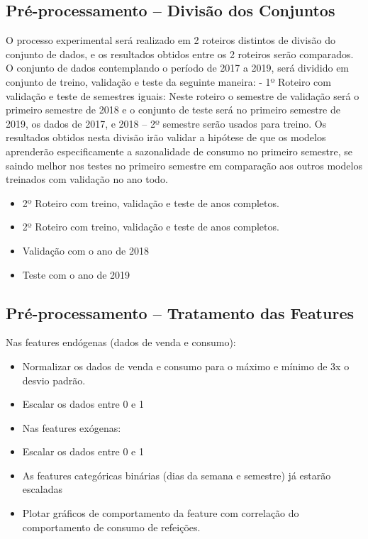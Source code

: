 \documentclass[	12pt, Times, openright, twoside, a4paper, english, brazil]{abntex2}
\begin{document}
	\subsection{Pré-processamento – Divisão dos Conjuntos}
        O processo experimental será realizado em 2 roteiros distintos de divisão do conjunto de dados, e os resultados obtidos entre os 2 roteiros serão comparados.
        O conjunto de dados contemplando o período de 2017 a 2019, será dividido em conjunto de treino, validação e teste da seguinte maneira: 
        - 1º Roteiro com validação e teste de semestres iguais: 
        Neste roteiro o semestre de validação será o primeiro semestre de 2018 e o conjunto de teste será no primeiro semestre de 2019, os dados de 2017, e 2018 – 2º semestre serão usados para treino. Os resultados obtidos nesta divisão irão validar a hipótese de que os modelos aprenderão especificamente a sazonalidade de consumo no primeiro semestre, se saindo melhor nos testes no primeiro semestre em comparação aos outros modelos treinados com validação no ano todo.
        \begin{itemize}
                \item 2º Roteiro com treino, validação e teste de anos completos.
                \item 2º Roteiro com treino, validação e teste de anos completos.
                \item Validação com o ano de 2018
                \item Teste com o ano de 2019             
        \end{itemize}

        \subsection{Pré-processamento – Tratamento das Features}
         	Nas features endógenas (dados de venda e consumo):
         	\begin{itemize}
                \item	Normalizar os dados de venda e consumo para o máximo e mínimo de 3x o desvio padrão. 
                \item	Escalar os dados entre 0 e 1
                \item	Nas features exógenas:
                \item	Escalar os dados entre 0 e 1
                \item	As features categóricas binárias (dias da semana e semestre) já estarão escaladas
                \item   Plotar gráficos de comportamento da feature com correlação do comportamento de consumo de refeições.
            \end{itemize}
\end{document}

